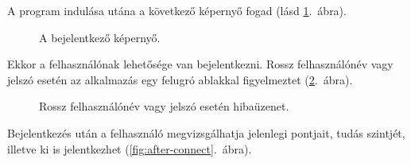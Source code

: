 \documentclass[11pt, a4paper]{article}
\begin{document}
     A program indulása utána a következő képernyő fogad (lásd \ref{fig:connect}.~ábra).     
     \begin{figure}[htbp]
	     \center
	     \caption{A bejelentkező képernyő.}
	     \label{fig:connect}
     \end{figure} 
     Ekkor a felhasználónak lehetősége van bejelentkezni. Rossz felhasználónév vagy jelszó esetén az alkalmazás egy felugró ablakkal figyelmeztet (\ref{fig:login-error}.~ábra).
     \begin{figure}[htbp]
     	\center
     	\caption{Rossz felhasználónév vagy jelszó esetén hibaüzenet.}
     	\label{fig:login-error}
     \end{figure}
     Bejelentkezés után a felhasználó megvizsgálhatja jelenlegi pontjait, tudás szintjét, illetve ki is jelentkezhet (\ref{fig:after-connect}.~ábra).     
\end{document}
